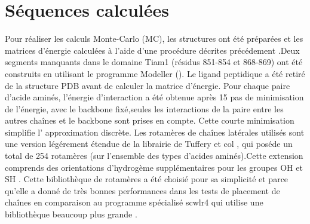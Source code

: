 %   
%   
%


\section{Séquences calculées}

Pour réaliser les calculs Monte-Carlo (MC), les structures ont été préparées et les matrices d'énergie calculées à l'aide d'une procédure décrites précédement \cite{Schmidt09,Schmidt10}.Deux segments manquants dans le domaine Tiam1 (résidus 851-854 et 868-869) ont été construits en utilisant le programme Modeller (\cite{Modeller}). Le ligand peptidique a été retiré de la structure PDB avant de calculer la matrice d'énergie. Pour chaque paire d'acide aminés, l'énergie d'interaction a été obtenue après 15 pas de minimisation de l'énergie, avec le backbone fixé,seules les interactions de la paire entre les autres chaînes et le backbone sont prises en compte. Cette courte minimisation simplifie l' approximation discrète. Les rotamères de chaînes latérales utilisés sont une version légérement étendue de la librairie de Tuffery et col \cite{Tuffery91}, qui poséde un total de 254 rotamères (sur l'ensemble des types d'acides aminés).Cette extension comprends des orientations d'hydrogème supplémentaires pour les groupes OH et SH \cite{Gaillard14}. Cette bibliothèque de rotamères a été choisié pour sa simplicité et parce qu'elle a donné de très bonnes performances dans les tests de placement de chaînes en comparaison au programme spécialisé scwlr4 qui utilise une bibliothèque beaucoup plus grande \cite{Krivov09,Gaillard16}.




